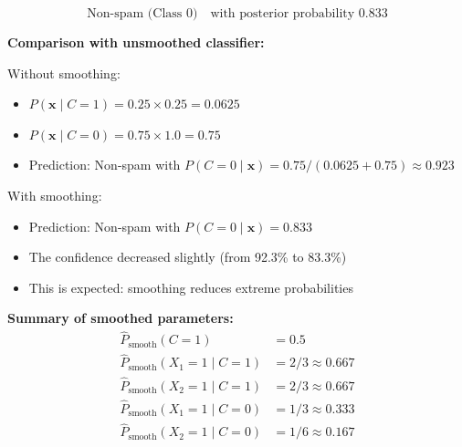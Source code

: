 \documentclass[12pt]{article}
\begin{document}
\begin{solution}
\[
\boxed{\text{Non-spam (Class 0)} \quad \text{with posterior probability } 0.833}
\]

\textbf{Comparison with unsmoothed classifier:}

Without smoothing:
\begin{itemize}
    \item $P(\mathbf{x} \mid C = 1) = 0.25 \times 0.25 = 0.0625$
    \item $P(\mathbf{x} \mid C = 0) = 0.75 \times 1.0 = 0.75$
    \item Prediction: Non-spam with $P(C = 0 \mid \mathbf{x}) = 0.75/(0.0625 + 0.75) \approx 0.923$
\end{itemize}

With smoothing:
\begin{itemize}
    \item Prediction: Non-spam with $P(C = 0 \mid \mathbf{x}) = 0.833$
    \item The confidence decreased slightly (from 92.3\% to 83.3\%)
    \item This is expected: smoothing reduces extreme probabilities
\end{itemize}

\textbf{Summary of smoothed parameters:}
\[
\boxed{
\begin{aligned}
\hat{P}_{\text{smooth}}(C = 1) &= 0.5 \\
\hat{P}_{\text{smooth}}(X_1 = 1 \mid C = 1) &= 2/3 \approx 0.667 \\
\hat{P}_{\text{smooth}}(X_2 = 1 \mid C = 1) &= 2/3 \approx 0.667 \\
\hat{P}_{\text{smooth}}(X_1 = 1 \mid C = 0) &= 1/3 \approx 0.333 \\
\hat{P}_{\text{smooth}}(X_2 = 1 \mid C = 0) &= 1/6 \approx 0.167
\end{aligned}
}
\]
\end{solution}
\end{document}
